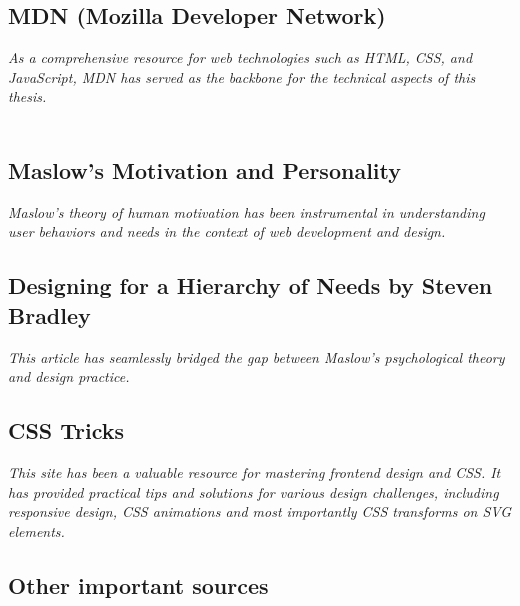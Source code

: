 \subsection*{MDN (Mozilla Developer Network)}
\textit{As a comprehensive resource for web technologies such as HTML, CSS, and JavaScript, MDN has served as the backbone for the technical aspects of this thesis.}\\
\\

\subsection*{Maslow's Motivation and Personality}
\textit{Maslow's theory of human motivation has been instrumental in understanding user behaviors and needs in the context of web development and design.}\\

\subsection*{Designing for a Hierarchy of Needs by Steven Bradley}
\textit{This article has seamlessly bridged the gap between Maslow's psychological theory and design practice.}\\

\subsection*{CSS Tricks}
\textit{This site has been a valuable resource for mastering frontend design and CSS.
It has provided practical tips and solutions for various design challenges, including responsive design, CSS animations and most importantly CSS transforms on SVG elements.}\\

\subsection*{Other important sources}
\\
\\
\\
\\

